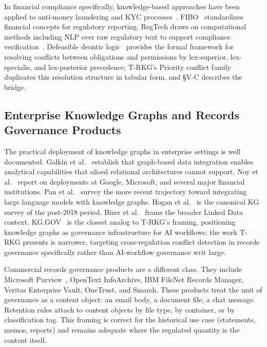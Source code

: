 \documentclass{ieeeaccess}
\begin{document}
In financial compliance specifically, knowledge-based approaches have been applied to anti-money laundering and KYC processes~\cite{weber2019}. FIBO~\cite{fibo} standardizes financial concepts for regulatory reporting. RegTech draws on computational methods including NLP over raw regulatory text to support compliance verification~\cite{arner2017,legalbert}. Defeasible deontic logic~\cite{governatori2013} provides the formal framework for resolving conflicts between obligations and permissions by lex-superior, lex-specialis, and lex-posterior precedence; T-RKG's Priority conflict family duplicates this resolution structure in tabular form, and §V-C describes the bridge.

\subsection{Enterprise Knowledge Graphs and Records Governance Products}

The practical deployment of knowledge graphs in enterprise settings is well documented. Galkin et al.~\cite{galkin2017} establish that graph-based data integration enables analytical capabilities that siloed relational architectures cannot support. Noy et al.~\cite{noy2019} report on deployments at Google, Microsoft, and several major financial institutions. Pan et al.~\cite{pan2024} survey the more recent trajectory toward integrating large language models with knowledge graphs. Hogan et al.~\cite{hogan2021} is the canonical KG survey of the post-2018 period. Bizer et al.~\cite{bizer2009,linkeddata} frame the broader Linked Data context. KG.GOV~\cite{kggov2025} is the closest analog to T-RKG's framing, positioning knowledge graphs as governance infrastructure for AI workflows; the work T-RKG presents is narrower, targeting cross-regulation conflict detection in records governance specifically rather than AI-workflow governance writ large.

Commercial records governance products are a different class. They include Microsoft Purview~\cite{purview}, OpenText InfoArchive, IBM FileNet Records Manager, Veritas Enterprise Vault, OneTrust, and Smarsh. These products treat the unit of governance as a content object: an email body, a document file, a chat message. Retention rules attach to content objects by file type, by container, or by classification tag. This framing is correct for the historical use case (statements, memos, reports) and remains adequate where the regulated quantity is the content itself.
\end{document}
